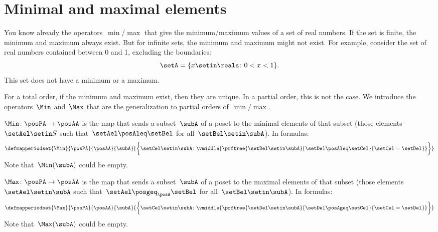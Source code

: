 \section{Minimal and maximal elements}

You know already the operators~$\min$/$\max$ that give the minimum/maximum values of a set of real numbers.
If the set is finite, the minimum and maximum always exist.
But for infinite sets, the minimum and maximum might not exist.
For example, consider the set of real numbers contained between 0 and 1, excluding the boundaries:
%
\begin{equation}
    \setA = \{ x \setin \reals  \colon 0 < x < 1 \}.
\end{equation}
%
This set does not have a minimum or a maximum.

For a total order, if the minimum and maximum exist, then they are unique.
In a partial order, this is not the case.
We introduce the operators~$\Min$ and~$\Max$ that are the generalization to partial orders of~$\min/\max$.

\begin{ctdefinition}
    \label{def:Min}
    $\Min \colon \posPA \to \posAA$ is the map that sends a subset~$\subA$ of a poset to the minimal elements of that subset (those elements~$\setAel \setin S$ such that~$\setAel \posAleq \setBel$ for all~$\setBel \setin \subA$).
    In formulas:
    \begin{equation*}
        \defmapperiodset{\Min}{\posPA}{\posAA}{\subA}{\bigg\{
            \setCel\setin \subA\colon
            \vmiddle{
                \prftree{
                    \setDel\setin \subA
                }{
                    \setDel\posAleq \setCel
                }{
                    \setCel=\setDel
                }
            }
            \bigg\}}
    \end{equation*}
    Note that~$\Min(\subA)$ could be empty.
\end{ctdefinition}

\begin{ctdefinition}
    \label{def:Max}
    $\Max \colon \posPA \to \posAA$ is the map that sends a subset~$\subA$ of a poset to the maximal elements of that subset (those elements~$\setAel \setin \subA$ such that~$\setAel \posgeq_\posA \setBel$ for all~$\setBel \setin \subA$).
    In formulas:
    \begin{equation*}
        \defmapperiodset{
            \Max
        }{
            \posPA
        }{
            \posAA
        }{
            \subA
        }{
            \bigg\{
            \setCel\setin \subA\colon
            \vmiddle{
                \prftree{
                    \setDel\setin \subA
                }{
                    \setDel\posAgeq \setCel
                }{
                    \setCel=\setDel
                }
            }
            \bigg\}
        }
    \end{equation*}
    Note that~$\Max(\subA)$ could be empty.
\end{ctdefinition}

